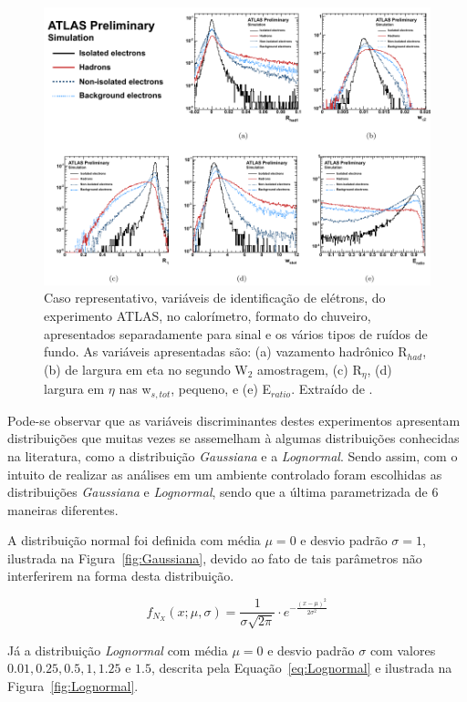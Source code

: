 \begin{figure}[!ht]
	\begin{center}
		\includegraphics[width=0.8\linewidth]{./figuras/variaveisATLAS.pdf}
		\caption{Caso representativo, variáveis de identificação de elétrons, do experimento ATLAS, no calorímetro, formato do chuveiro, apresentados separadamente para sinal e os vários tipos de ruídos de fundo. As variáveis apresentadas são: (a) vazamento hadrônico R${_{had}}$, (b) de largura em eta no segundo W${_2}$ amostragem, (c) R${_\eta}$, (d) largura em $\eta$ nas w${_{s,tot}}$, pequeno, e (e) E${_{ratio}}$. Extraído de \cite{alison2014road}.}\label{fig:16}
	\end{center}
\end{figure}

Pode-se observar que as variáveis discriminantes destes experimentos apresentam distribuições que muitas vezes se assemelham à algumas distribuições conhecidas na literatura, como a distribuição \textit{Gaussiana} e a \textit{Lognormal}. Sendo assim, com o intuito de realizar as análises em um ambiente controlado foram escolhidas as distribuições \textit{Gaussiana} e \textit{Lognormal}, sendo que a última parametrizada de 6 maneiras diferentes.

A distribuição normal foi definida com média $ \mu =0 $ e desvio padrão $ \sigma = 1 $, ilustrada na Figura~\ref{fig:Gaussiana}, devido ao fato de tais parâmetros não interferirem na forma desta distribuição.

\begin{equation}
{\displaystyle f_{N_X}(x;\mu,\sigma) = \frac{1}{\sigma\sqrt{2\pi}}\cdot e^{-\frac{(x-\mu)^2}{2\sigma^2}}}
\label{equ:Normal}
\end{equation}

Já a distribuição \textit{Lognormal} com média $ \mu = 0 $ e desvio padrão $\sigma$ com valores $0.01, 0.25, 0.5, 1, 1.25$ e $1.5$, descrita pela Equação~\eqref{eq:Lognormal} e ilustrada na Figura~\ref{fig:Lognormal}.

